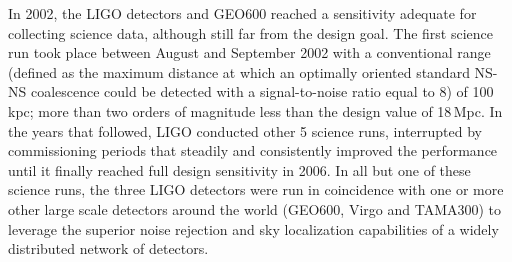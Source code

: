 In 2002, the LIGO detectors and GEO600 reached a sensitivity adequate for collecting science data, although still far from the design goal.
The first science run took place between August and September 2002 with a conventional range (defined as the maximum distance at which an optimally oriented standard NS-NS coalescence could be detected with a signal-to-noise ratio equal to 8) of 100\,kpc; more than two orders of magnitude less than the design value of 18\,Mpc.
In the years that followed, LIGO conducted other 5 science runs, interrupted by commissioning periods that steadily and consistently improved the performance until it finally reached full design sensitivity in 2006.
In all but one of these science runs, the three LIGO detectors were run in coincidence with one or more other large scale detectors around the world (GEO600, Virgo and TAMA300) to leverage the superior noise rejection and sky localization capabilities of a widely distributed network of detectors\cite{Abbott_2004,Abbott_2005,Abbott_2006,Abbott_2008,Abadie_2010}.

